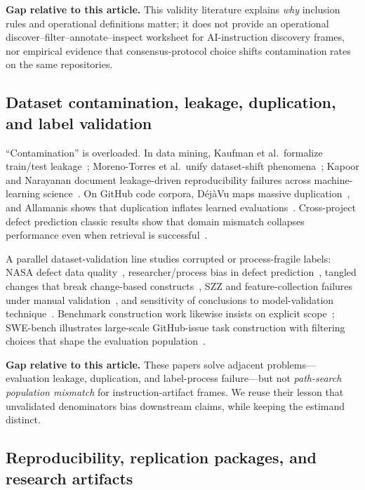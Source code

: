 \textbf{Gap relative to this article.}
This validity literature explains \emph{why} inclusion rules and operational definitions matter; it does not provide an operational discover--filter--annotate--inspect worksheet for AI-instruction discovery frames, nor empirical evidence that consensus-protocol choice shifts contamination rates on the same repositories.

\subsection{Dataset contamination, leakage, duplication, and label validation}
\label{subsec:rw-contamination}

``Contamination'' is overloaded.
In data mining, Kaufman et al.\ formalize train/test leakage~\cite{kaufman2012leakage}; Moreno-Torres et al.\ unify dataset-shift phenomena~\cite{moreno2012shift}; Kapoor and Narayanan document leakage-driven reproducibility failures across machine-learning science~\cite{kapoor2023leakage}.
On GitHub code corpora, D{\'e}j{\`a}Vu maps massive duplication~\cite{lopes2017dejavu}, and Allamanis shows that duplication inflates learned evaluations~\cite{allamanis2019duplication}.
Cross-project defect prediction classic results show that domain mismatch collapses performance even when retrieval is successful~\cite{zimmermann2009cross}.

A parallel dataset-validation line studies corrupted or process-fragile labels: NASA defect data quality~\cite{shepperd2013nasa}, researcher/process bias in defect prediction~\cite{shepperd2014bias}, tangled changes that break change-based constructs~\cite{herzig2013tangled}, SZZ and feature-collection failures under manual validation~\cite{herbold2022szz}, and sensitivity of conclusions to model-validation technique~\cite{tantithamthavorn2017}.
Benchmark construction work likewise insists on explicit scope~\cite{dambros2012benchmark}; SWE-bench illustrates large-scale GitHub-issue task construction with filtering choices that shape the evaluation population~\cite{jimenez2024swebench}.

\textbf{Gap relative to this article.}
These papers solve adjacent problems---evaluation leakage, duplication, and label-process failure---but not \emph{path-search population mismatch} for instruction-artifact frames.
We reuse their lesson that unvalidated denominators bias downstream claims, while keeping the estimand distinct.

\subsection{Reproducibility, replication packages, and research artifacts}
\label{subsec:rw-repro}

